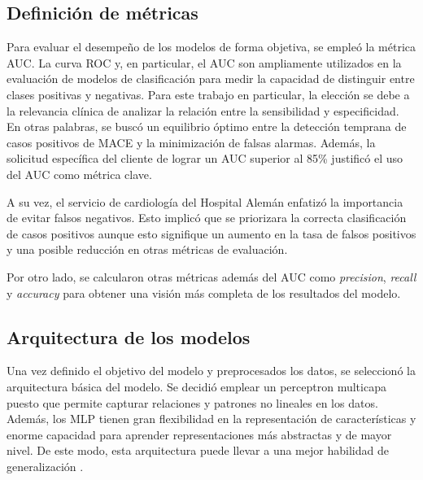 \subsection{Definición de métricas}

Para evaluar el desempeño de los modelos de forma objetiva, se empleó la métrica AUC. La curva ROC y, 
en particular, el AUC son ampliamente utilizados en la evaluación de modelos de clasificación para 
medir la capacidad de distinguir entre clases positivas y negativas. Para este trabajo en particular, 
la elección se debe a la relevancia clínica de analizar la relación entre la sensibilidad y especificidad. 
En otras palabras, se buscó un equilibrio óptimo entre la detección temprana de casos positivos de MACE 
y la minimización de falsas alarmas. Además, la solicitud específica del cliente de lograr un AUC superior 
al 85\% justificó el uso del AUC como métrica clave. 

A su vez, el servicio de cardiología del Hospital Alemán enfatizó la importancia de evitar falsos negativos. 
Esto implicó que se priorizara la correcta clasificación de casos positivos aunque esto signifique un aumento 
en la tasa de falsos positivos y una posible reducción en otras métricas de evaluación. 

Por otro lado, se calcularon otras métricas además del AUC como \emph{precision}, \emph{recall} y \emph{accuracy} 
para obtener una visión más completa de los resultados del modelo.


\subsection{Arquitectura de los modelos}
\label{sec:arquitectura}
Una vez definido el objetivo del modelo y preprocesados los datos, se seleccionó la arquitectura básica del modelo. 
Se decidió emplear un perceptron multicapa puesto que permite capturar relaciones y patrones no lineales en los 
datos. Además, los MLP tienen gran flexibilidad en la representación de características y enorme capacidad para 
aprender representaciones más abstractas y de mayor nivel. De este modo, esta arquitectura puede llevar a una 
mejor habilidad de generalización \citep{CITE:35} \citep{CITE:44}. 


